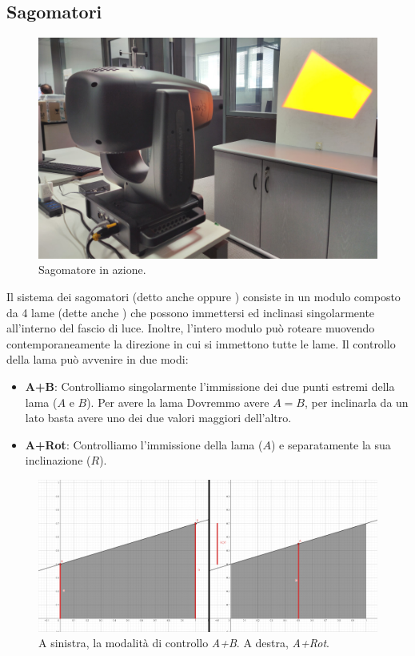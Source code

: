 \documentclass[main.tex]{subfiles}
\begin{document}
\subsection{Sagomatori}\label{subsec:5_shaper}
\begin{figure}[H]
    \centering
    \includegraphics[width=.8\linewidth]{img/newFeatures/shaper.jpg}
    \caption{Sagomatore in azione.}
    \label{fig:5_shaper}
\end{figure}
Il sistema dei sagomatori (detto anche  oppure ) consiste in un modulo composto da 4 lame (dette anche ) che possono immettersi ed inclinasi singolarmente all'interno del fascio di luce. Inoltre, l'intero modulo può roteare muovendo contemporaneamente la direzione in cui si immettono tutte le lame. \newline
\clearpage %
Il controllo della lama può avvenire in due modi:
\begin{itemize}
	\item \textbf{A+B}: Controlliamo singolarmente l'immissione dei due punti estremi della lama ($A$ e $B$). Per avere la lama  Dovremmo avere $A = B$, per inclinarla da un lato basta avere uno dei due valori maggiori dell'altro.
	\item \textbf{A+Rot}: Controlliamo l'immissione della lama ($A$) e separatamente la sua inclinazione ($R$).
\end{itemize}
\begin{figure}[H]
    \centering
    \includegraphics[width=1\linewidth]{img/newFeatures/abVSarot.png}
    \caption{A sinistra, la modalità di controllo \textit{A+B}. A destra, \textit{A+Rot}.}
    \label{fig:5_shaperDifferentModes}
\end{figure}
\end{document}
